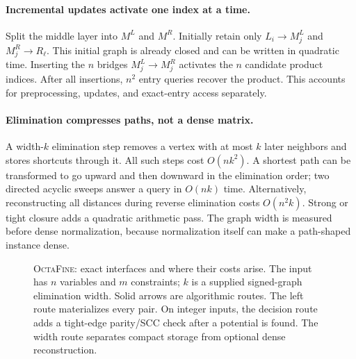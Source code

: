 \documentclass[manuscript,11pt,screen,nonacm]{acmart}
\theoremstyle{definition}
\newcommand{\OctaFine}{\textsc{OctaFine}}
\begin{document}
\paragraph{Incremental updates activate one index at a time.}
Split the middle layer into $M^L$ and $M^R$. Initially retain only $L_i\to M^L_j$ and $M^R_j\to R_\ell$. This initial graph is already closed and can be written in quadratic time. Inserting the $n$ bridges $M^L_j\to M^R_j$ activates the $n$ candidate product indices. After all insertions, $n^2$ entry queries recover the product. This accounts for preprocessing, updates, and exact-entry access separately.

\paragraph{Elimination compresses paths, not a dense matrix.}
A width-$k$ elimination step removes a vertex with at most $k$ later neighbors and stores shortcuts through it. All such steps cost $O(nk^2)$. A shortest path can be transformed to go upward and then downward in the elimination order; two directed acyclic sweeps answer a query in $O(nk)$ time. Alternatively, reconstructing all distances during reverse elimination costs $O(n^2k)$. Strong or tight closure adds a quadratic arithmetic pass. The graph width is measured before dense normalization, because normalization itself can make a path-shaped instance dense.

\begin{figure}[H]
\centering

\caption{\OctaFine: exact interfaces and where their costs arise. The input has $n$ variables and $m$ constraints; $k$ is a supplied signed-graph elimination width. Solid arrows are algorithmic routes. The left route materializes every pair. On integer inputs, the decision route adds a tight-edge parity/SCC check after a potential is found. The width route separates compact storage from optional dense reconstruction.}
\label{fig:framework}
\end{figure}
\end{document}

